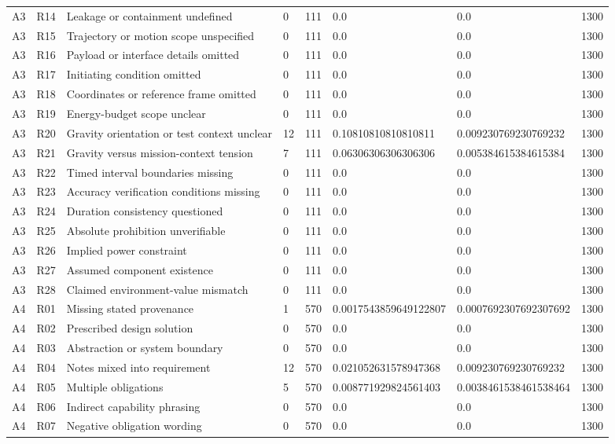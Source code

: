 \begin{tabular}{llllllll}
A3 & R14 & Leakage or containment undefined & 0 & 111 & 0.0 & 0.0 & 1300 \\
A3 & R15 & Trajectory or motion scope unspecified & 0 & 111 & 0.0 & 0.0 & 1300 \\
A3 & R16 & Payload or interface details omitted & 0 & 111 & 0.0 & 0.0 & 1300 \\
A3 & R17 & Initiating condition omitted & 0 & 111 & 0.0 & 0.0 & 1300 \\
A3 & R18 & Coordinates or reference frame omitted & 0 & 111 & 0.0 & 0.0 & 1300 \\
A3 & R19 & Energy-budget scope unclear & 0 & 111 & 0.0 & 0.0 & 1300 \\
A3 & R20 & Gravity orientation or test context unclear & 12 & 111 & 0.10810810810810811 & 0.009230769230769232 & 1300 \\
A3 & R21 & Gravity versus mission-context tension & 7 & 111 & 0.06306306306306306 & 0.005384615384615384 & 1300 \\
A3 & R22 & Timed interval boundaries missing & 0 & 111 & 0.0 & 0.0 & 1300 \\
A3 & R23 & Accuracy verification conditions missing & 0 & 111 & 0.0 & 0.0 & 1300 \\
A3 & R24 & Duration consistency questioned & 0 & 111 & 0.0 & 0.0 & 1300 \\
A3 & R25 & Absolute prohibition unverifiable & 0 & 111 & 0.0 & 0.0 & 1300 \\
A3 & R26 & Implied power constraint & 0 & 111 & 0.0 & 0.0 & 1300 \\
A3 & R27 & Assumed component existence & 0 & 111 & 0.0 & 0.0 & 1300 \\
A3 & R28 & Claimed environment-value mismatch & 0 & 111 & 0.0 & 0.0 & 1300 \\
A4 & R01 & Missing stated provenance & 1 & 570 & 0.0017543859649122807 & 0.0007692307692307692 & 1300 \\
A4 & R02 & Prescribed design solution & 0 & 570 & 0.0 & 0.0 & 1300 \\
A4 & R03 & Abstraction or system boundary & 0 & 570 & 0.0 & 0.0 & 1300 \\
A4 & R04 & Notes mixed into requirement & 12 & 570 & 0.021052631578947368 & 0.009230769230769232 & 1300 \\
A4 & R05 & Multiple obligations & 5 & 570 & 0.008771929824561403 & 0.0038461538461538464 & 1300 \\
A4 & R06 & Indirect capability phrasing & 0 & 570 & 0.0 & 0.0 & 1300 \\
A4 & R07 & Negative obligation wording & 0 & 570 & 0.0 & 0.0 & 1300 \\

\end{tabular}
